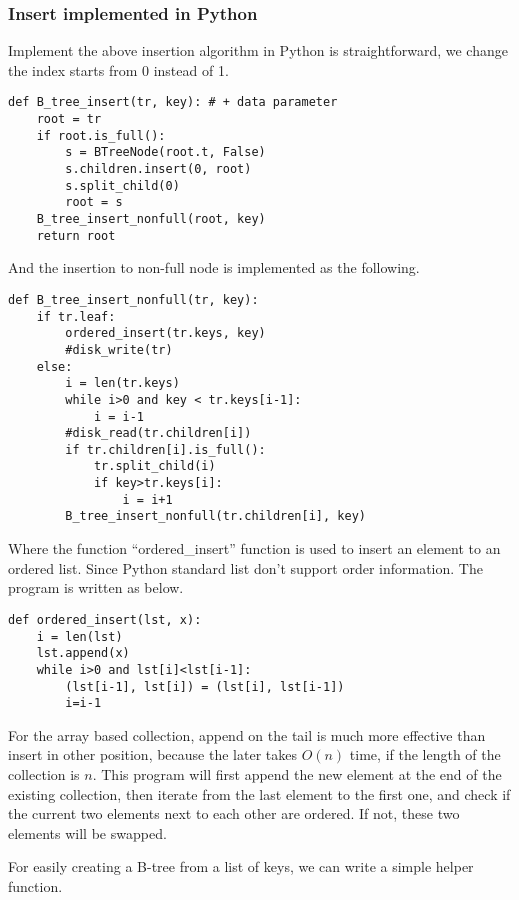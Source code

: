 \documentclass{article}
\begin{document}
\subsubsection*{Insert implemented in Python}
Implement the above insertion algorithm in Python is straightforward, we change
the index starts from 0 instead of 1.

\lstset{language=Python}
\begin{lstlisting}
def B_tree_insert(tr, key): # + data parameter
    root = tr
    if root.is_full():
        s = BTreeNode(root.t, False)
        s.children.insert(0, root)
        s.split_child(0)
        root = s
    B_tree_insert_nonfull(root, key)
    return root
\end{lstlisting}

And the insertion to non-full node is implemented as the following.

\begin{lstlisting}
def B_tree_insert_nonfull(tr, key):
    if tr.leaf:
        ordered_insert(tr.keys, key)
        #disk_write(tr)
    else:
        i = len(tr.keys)
        while i>0 and key < tr.keys[i-1]:
            i = i-1
        #disk_read(tr.children[i])
        if tr.children[i].is_full():
            tr.split_child(i)
            if key>tr.keys[i]:
                i = i+1
        B_tree_insert_nonfull(tr.children[i], key)
\end{lstlisting}

Where the function ``ordered\_insert'' function is used to insert an element
to an ordered list. Since Python standard list don't support order information.
The program is written as below.

\begin{lstlisting}
def ordered_insert(lst, x):
    i = len(lst)
    lst.append(x)
    while i>0 and lst[i]<lst[i-1]:
        (lst[i-1], lst[i]) = (lst[i], lst[i-1])
        i=i-1
\end{lstlisting}

For the array based collection, append on the tail is much more effective than
insert in other position, because the later takes $O(n)$ time, if the length
of the collection is $n$. This program will first append the new element at
the end of the existing collection, then iterate from the last element to
the first one, and check if the current two elements next to each other
are ordered. If not, these two elements will be swapped.

For easily creating a B-tree from a list of keys, we can write a simple helper
function.
\end{document}
